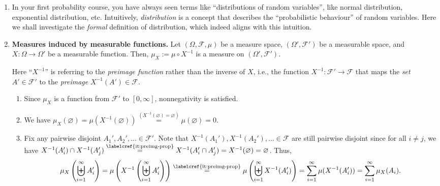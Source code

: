 \begin{enumerate}
\item In your first probability course, you have always seen terms like
``distributions of random variables'', like normal distribution, exponential
distribution, etc. Intuitively, \emph{distribution} is a concept that describes
the ``probabilistic behaviour'' of random variables. Here we shall investigate
the \emph{formal} definition of distribution, which indeed aligns with this
intuition.
\item \label{it:meas-fn-dist} \textbf{Measures induced by measurable functions.}
Let \((\Omega,\mathcal{F},\mu)\) be a measure space, \((\Omega',\mathcal{F}')\)
be a measurable space, and \(X:\Omega\to\Omega'\) be a measurable function.
Then, \(\mu_X:=\mu\circ X^{-1}\) is a measure on \((\Omega',\mathcal{F}')\).

\begin{note}
Here ``\(X^{-1}\)'' is referring to the \emph{preimage function} rather
than the inverse of \(X\), i.e., the function
\(X^{-1}:\mathcal{F}'\to\mathcal{F}\) that maps the \emph{set}
\(A'\in\mathcal{F}'\) to the \emph{preimage} \(X^{-1}(A')\in\mathcal{F}\).
\end{note}

\begin{pf}
\begin{enumerate}[label={(\arabic*)}]
\item Since \(\mu_X\) is a function from \(\mathcal{F}'\) to \([0,\infty]\), nonnegativity is satisfied.
\item We have \(\mu_X(\varnothing)=\mu(X^{-1}(\varnothing))
\overset{(X^{-1}(\varnothing)=\varnothing)}{=}\mu(\varnothing)=0\).
\item Fix any pairwise disjoint \(A_1',A_2',\dotsc\in\mathcal{F}'\). Note that
\(X^{-1}(A_1'),X^{-1}(A_2'),\dotsc\in\mathcal{F}\) are still pairwise disjoint
since for all \(i\ne j\), we have \(X^{-1}(A_i')\cap X^{-1}(A_j')
\overset{\text{\labelcref{it:preimg-prop}}}{=}X^{-1}(A_i'\cap
A_j')=X^{-1}(\varnothing)=\varnothing\). Thus,
\[
\mu_X\left(\biguplus_{i=1}^{\infty}A_i'\right)
=\mu\left(X^{-1}\left(\biguplus_{i=1}^{\infty}A_i'\right)\right)
\overset{\text{\labelcref{it:preimg-prop}}}{=}
\mu\left(\biguplus_{i=1}^{\infty}X^{-1}(A_i')\right)
=\sum_{i=1}^{\infty}\mu(X^{-1}(A_i'))
=\sum_{i=1}^{\infty}\mu_X(A_i).
\]
\end{enumerate}
\end{pf}


\end{enumerate}
